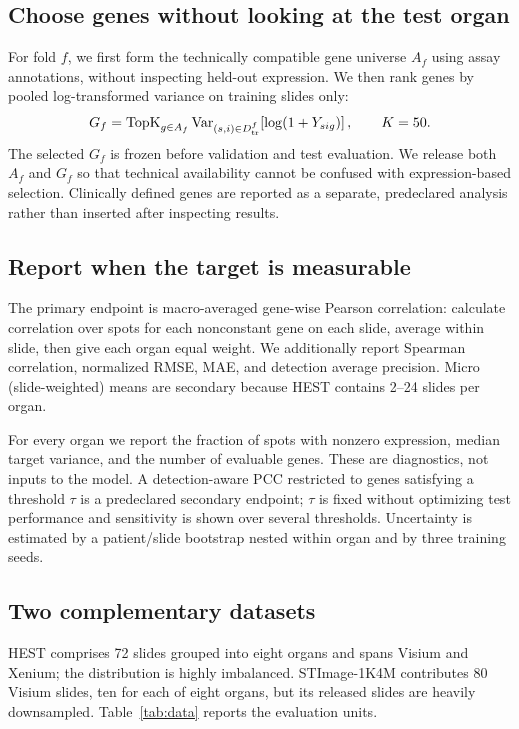 \subsection{Choose genes without looking at the test organ}
For fold $f$, we first form the technically compatible gene universe $A_f$ using assay annotations,
without inspecting held-out expression. We then rank genes by pooled log-transformed variance on
training slides only:
\begin{equation}
G_f=\operatorname{TopK}_{g\in A_f}
\operatorname{Var}_{(s,i)\in D^{f}_{\rm tr}}
\!\left[\log(1+Y_{sig})\right],\qquad K=50.
\label{eq:panel}
\end{equation}
The selected $G_f$ is frozen before validation and test evaluation. We release both $A_f$ and $G_f$
so that technical availability cannot be confused with expression-based selection. Clinically defined
genes are reported as a separate, predeclared analysis rather than inserted after inspecting results.

\subsection{Report when the target is measurable}
The primary endpoint is macro-averaged gene-wise Pearson correlation: calculate correlation over
spots for each nonconstant gene on each slide, average within slide, then give each organ equal weight.
We additionally report Spearman correlation, normalized RMSE, MAE, and detection average precision.
Micro (slide-weighted) means are secondary because HEST contains 2--24 slides per organ.

For every organ we report the fraction of spots with nonzero expression, median target variance, and
the number of evaluable genes. These are diagnostics, not inputs to the model. A detection-aware PCC
restricted to genes satisfying a threshold $\tau$ is a predeclared secondary endpoint; $\tau$ is fixed
without optimizing test performance and sensitivity is shown over several thresholds. Uncertainty is
estimated by a patient/slide bootstrap nested within organ and by three training seeds.

\subsection{Two complementary datasets}
HEST comprises 72 slides grouped into eight organs and spans Visium and Xenium; the distribution is
highly imbalanced. STImage-1K4M contributes 80 Visium slides, ten for each of eight organs, but its
released slides are heavily downsampled. Table~\ref{tab:data} reports the evaluation units.

